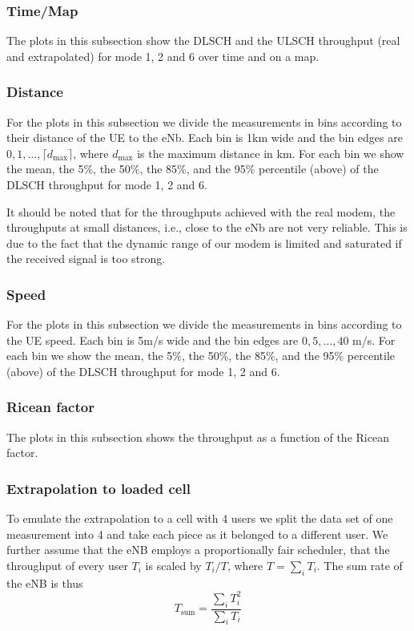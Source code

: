 \documentclass[a4paper,10pt]{article}
\begin{document}
\subsubsection{Time/Map}

The plots in this subsection show the DLSCH and the ULSCH throughput (real and extrapolated) for mode 1, 2 and 6 over time and on a map. 

\subsubsection{Distance}

For the plots in this subsection we divide the measurements in bins according to their distance of the UE to the eNb. Each bin is 1km wide and the bin edges are $0, 1, \ldots, \lceil d_{\max} \rceil$, where $d_{\max}$ is the maximum distance in km. For each bin we show the mean, the 5\%, the 50\%, the 85\%, and the 95\% percentile (above) of the DLSCH throughput for mode 1, 2 and 6. 

It should be noted that for the throughputs achieved with the real modem, the throughputs at small distances, i.e., close to the eNb are not very reliable. This is due to the fact that the dynamic range of our modem is limited and saturated if the received signal is too strong. 

\subsubsection{Speed}

For the plots in this subsection we divide the measurements in bins according to the UE speed. Each bin is 5m/s wide and the bin edges are $0,5,\ldots,40$ m/s. For each bin we show the mean, the 5\%, the 50\%, the 85\%, and the 95\% percentile (above) of the DLSCH throughput for mode 1, 2 and 6. 

\subsubsection{Ricean factor}

The plots in this subsection shows the throughput as a function of the Ricean factor.

\subsubsection{Extrapolation to loaded cell}

To emulate the extrapolation to a cell with 4 users we split the data set of one measurement into 4 and take each piece as it belonged to a different user. We further assume that the eNB employs a proportionally fair scheduler, that the throughput of every user $T_i$ is scaled by $T_i/T$, where $T=\sum_i T_i$. The sum rate of the eNB is thus
\begin{equation}
 T_{\mathrm{sum}} = \frac{\sum_i T_i^2}{\sum_i T_i}
\end{equation}
\end{document}

